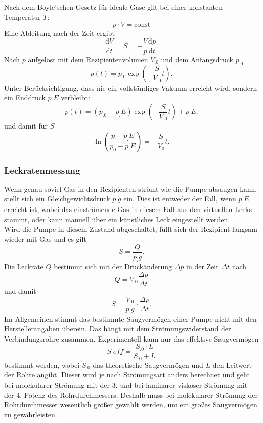 Nach dem Boyle'schen Gesetz für ideale Gase gilt bei einer konstanten Temperatur $T$:
\begin{equation}
p\cdot V =\text{const}\label{eq:Boyle}
\end{equation}
Eine Ableitung nach der Zeit ergibt
\[
\frac{\mathrm{d}V}{\mathrm{d}t} = S = - \frac{V}{p} \frac{\mathrm{d}p}{\mathrm{d}t}\text{.}
\]
Nach $p$ aufgelöst mit dem Rezipientenvolumen $V_.0$ und dem Anfangsdruck $p_.0$
\begin{equation}
p(t)=p_.0\exp{\left(-\frac{S}{V_.0}t\right)}\label{eq:pt1}\text{.}
\end{equation}
Unter Berücksichtigung, dass nie ein vollständiges Vakuum erreicht wird, sondern ein Enddruck $p_.E$ verbleibt:
\begin{equation}
p(t)=(p_.0-p_.E)\exp{\left(-\frac{S}{V_.0}t\right)}+p_.E\text{.}\label{eq:pt2}
\end{equation}
und damit für $S$
\begin{equation}
\ln\left(\frac{p-p_.E}{p_0-p_.E}\right) = -\frac{S}{V_0}t\text{.}\label{eq:S2}
\end{equation}

\subsubsection{Leckratenmessung}

Wenn genau soviel Gas in den Rezipienten strömt wie die Pumpe absaugen kann, stellt sich ein Gleichgewichtsdruck $p_.g$ ein. Dies ist entweder der Fall, wenn $p_.E$ erreicht ist, wobei das einströmende Gas in diesem Fall aus den virtuellen Lecks stammt, oder kann manuell über ein künstliches Leck eingestellt werden. \\
Wird die Pumpe in diesem Zustand abgeschaltet, füllt sich der Rezipient langsam wieder mit Gas und es gilt 
\[
S=\frac{Q}{p_.g}\text{.}
\]
Die Leckrate $Q$ bestimmt sich mit der Druckänderung $\Delta p$ in der Zeit $\Delta t$ nach
\[
Q=V_.0\frac{\Delta p}{\Delta t}
\]
und damit
\begin{equation}
S=\frac{V_.0}{p_.g}\cdot\frac{\Delta p}{\Delta t}\text{.}\label{eq:S}
\end{equation}
\newline\newline
Im Allgemeinen stimmt das bestimmte Saugvermögen einer Pumpe nicht mit den Herstellerangaben überein.
Das hängt mit dem Strömungswiderstand der Verbindungsrohre zusammen.
Experimentell kann nur das effektive Saugvermögen
\begin{equation}
S_.{eff}=\frac{S_.0\cdot L}{S_.0+L}
\end{equation}
bestimmt werden, wobei $S_.0$ das theoretische Saugvermögen und $L$ den Leitwert der Rohre angibt.
Dieser wird je nach Strömungsart anders berechnet und geht bei molekularer Strömung mit der 3. und bei laminarer viskoser Strömung mit der 4. Potenz des Rohrdurchmessers\cite{V70}.
Deshalb muss bei molekularer Strömung der Rohrdurchmesser wesentlich größer gewählt werden, um ein großes Saugvermögen zu gewährleisten.

